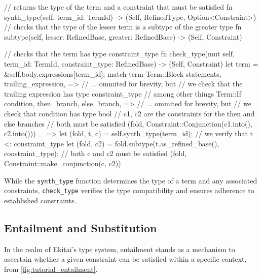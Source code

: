 \documentclass[
  oneside,
  english,
  coorientadorbanca,
  noabntexcite
]{ufsc-thesis-rn46-2019}
\begin{document}
\begin{rustcode}
// returns the type of the term and a constraint that must be satisfied
fn synth_type(self, term_id: TermId) -> (Self, RefinedType, Option<Constraint>)
// checks that the type of the lesser term is a subtype of the greater type
fn subtype(self, lesser: RefinedBase, greater: RefinedBase) -> (Self, Constraint)

// checks that the term has type constraint_type
fn check_type(mut self, term_id: TermId, constraint_type: RefinedBase) -> (Self, Constraint) {
    let term = &self.body.expressions[term_id];
    match term {
        Term::Block {
            statements,
            trailing_expression,
        } => {
            // ... ommited for brevity, but
            // we check that the trailing expression has type constraint_type
            // among other things
        }
        Term::If {
            condition,
            then_branch,
            else_branch,
        } => {
            // ... ommited for brevity, but
            // we check that condition has type bool
            // c1, c2 are the constraints for the then and else branches
            // both must be satisfied
            (fold, Constraint::Conjunction(c1.into(), c2.into()))
        }
        _ => {
            let (fold, t, c) = self.synth_type(term_id);
            // we verify that t <: constraint_type
            let (fold, c2) = fold.subtype(t.as_refined_base(), constraint_type);
            // both c and c2 must be satisfied
            (fold, Constraint::make_conjunction(c, c2))
        }
    }
}
\end{rustcode}

While the \texttt{synth_type} function determines the type of a term and any associated constraints, \texttt{check_type} verifies the type compatibility and ensures adherence to established constraints.

\subsection{Entailment and Substitution}

In the realm of Ekitai's type system, entailment stands as a mechanism to ascertain whether a given constraint can be satisfied within a specific context, from \autoref{fig:tutorial_entailment}.
\end{document}
